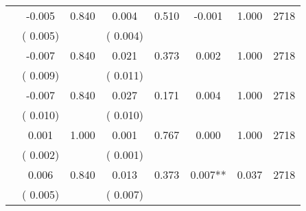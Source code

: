 \begin{tabular}{l*{7}{c}}
        &             -0.005       &        0.840  &              0.004       &        0.510  &             -0.001       &              1.000 &  2718 \\ 
                       &       (       0.005)             &                               &       (       0.004)                     &                               &                                               &                                &                      \\ 

        &             -0.007       &        0.840  &              0.021       &        0.373  &              0.002       &              1.000 &  2718 \\ 
                       &       (       0.009)             &                               &       (       0.011)                     &                               &                                               &                                &                      \\ 

        &             -0.007       &        0.840  &              0.027       &        0.171  &              0.004       &              1.000 &  2718 \\ 
                       &       (       0.010)             &                               &       (       0.010)                     &                               &                                               &                                &                      \\ 

        &              0.001       &        1.000  &              0.001       &        0.767  &              0.000       &              1.000 &  2718 \\ 
                       &       (       0.002)             &                               &       (       0.001)                     &                               &                                               &                                &                      \\ 

        &              0.006       &        0.840  &              0.013       &        0.373  &              0.007**       &              0.037 &  2718 \\ 
                       &       (       0.005)             &                               &       (       0.007)                     &                               &                                               &                                &                      \\ 


\end{tabular}

